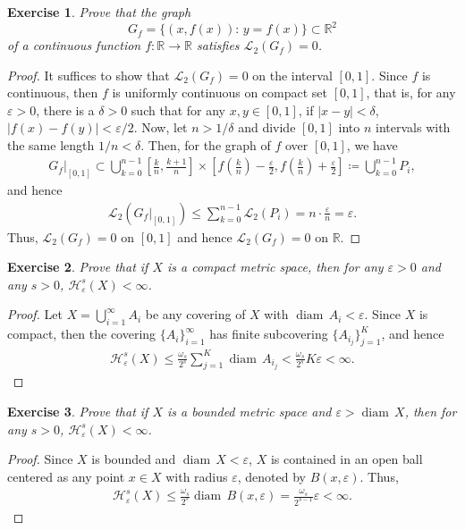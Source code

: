 \documentclass[11pt]{book}
\newtheorem{exercise}{Exercise}[section]
\theoremstyle{definition}
\numberwithin{equation}{chapter}
\def\H{{\mathcal H}}
\def\diam{{\operatorname{diam}\,}}
\begin{document}
\medskip

\begin{exercise}
Prove that the graph
$$
G_f=\{(x,f(x)):\, y=f(x)\}\subset\mathbb{R}^2
$$
of a continuous function $f:\mathbb{R}\to\mathbb{R}$ satisfies $\mathcal{L}_2(G_f)=0$.
\end{exercise}
\begin{proof}\cite{26}
It suffices to show that $\mathcal{L}_2(G_f)=0$ on the interval $[0,1]$. Since $f$ is continuous, then $f$ is uniformly continuous on compact set $[0,1]$, that is, for any $\varepsilon > 0$, there is a $\delta > 0$ such that for any $x, y \in [0,1]$, if $\left|x - y\right| < \delta$, $\left|f(x) - f(y)\right| < \varepsilon/2$. Now, let $n > 1/\delta$ and divide $[0,1]$ into $n$ intervals with the same length $1/n < \delta$. Then, for the graph of $f$ over $[0,1]$, we have
\begin{align*}
    G_f|_{[0,1]} \subset \bigcup^{n-1}_{k=0} \left[\frac{k}{n},\frac{k+1}{n}\right] \times \left[f\left(\frac{k}{n}\right) - \frac{\varepsilon}{2},f\left(\frac{k}{n}\right) + \frac{\varepsilon}{2}\right] \coloneqq \bigcup^{n-1}_{k=0} P_i,
\end{align*}
and hence
\begin{align*}
    \mathcal{L}_2\left(G_f|_{[0,1]}\right) \leq \sum^{n-1}_{k=0} \mathcal{L}_2\left(P_i\right) = n \cdot \frac{\varepsilon}{n} = \varepsilon.
\end{align*}
Thus, $\mathcal{L}_2(G_f)=0$ on $[0,1]$ and hence $\mathcal{L}_2(G_f)=0$ on $\mathbb{R}$.
\end{proof}

\medskip

\begin{exercise}
Prove that if $X$ is a compact metric space, then for any $\varepsilon>0$ and any $s>0$, $\H^s_\varepsilon(X)<\infty$.
\end{exercise}
\begin{proof}
Let $X = \bigcup^\infty_{i=1} A_i$ be any covering of $X$ with $\diam A_i < \varepsilon$. Since $X$ is compact, then the covering $\{A_i\}^\infty_{i=1}$ has finite subcovering $\{A_{i_j}\}^K_{j=1}$, and hence
\begin{align*}
    \mathcal{H}^s_{\varepsilon}(X) \leq \frac{\omega_s}{2^s} \sum^K_{j=1} \diam A_{i_j} < \frac{\omega_s}{2^s} K \varepsilon < \infty.
\end{align*}
\end{proof}

\medskip

\begin{exercise}
Prove that if $X$ is a bounded metric space and $\varepsilon>\diam X$, then for any $s>0$, $\H^s_\varepsilon(X)<\infty$.
\end{exercise}
\begin{proof}
Since $X$ is bounded and $\diam X < \varepsilon$, $X$ is contained in an open ball centered as any point $x \in X$ with radius $\varepsilon$, denoted by $B(x,\varepsilon)$. Thus,
\begin{align*}
    \mathcal{H}^s_{\varepsilon}(X) \leq \frac{\omega_s}{2^s} \diam B(x,\varepsilon) = \frac{\omega_s}{2^{s-1}} \varepsilon < \infty.
\end{align*}
\end{proof}
\end{document}
